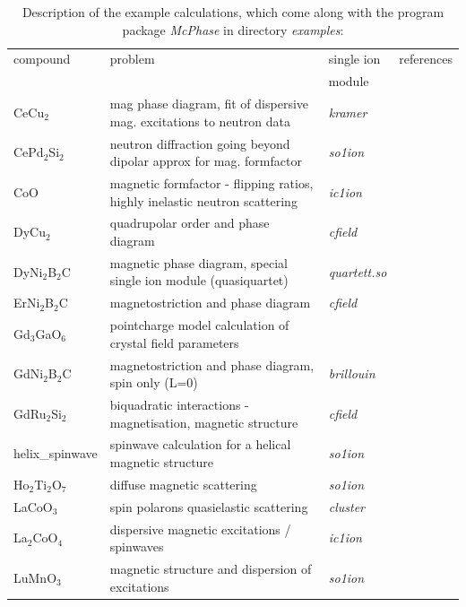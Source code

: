 \documentclass[twoside]{article}
\newcommand{\prg}{\sl}
\begin{document}
\begin{table}[thb] 
\begin{center}  
\caption {Description of the example calculations, which come along with the program package {\prg McPhase} in directory {\prg %
examples}:}   
\label{examples}   
\begin{tabular} 
{l|l|l|l}
compound & problem & single ion & references \\ 
        &          & module  &             \\
\hline
CeCu$_2$  & mag phase diagram, fit of dispersive mag. excitations to neutron data & {\prg kramer}\index{kramer} & %
\cite{loewenhaupt06-775,schedler03-1313} \\
CePd$_2$Si$_2$ & neutron diffraction going beyond dipolar approx for mag. formfactor & {\prg %
so1ion}&\cite{rotter09-140405} \\
CoO & magnetic formfactor - flipping ratios, highly inelastic neutron scattering  &{\prg  ic1ion} & \\
DyCu$_2$ & quadrupolar order and phase diagram & {\prg cfield}\index{cfield}&\cite{yoshida98-1421} \\
DyNi$_2$B$_2$C & magnetic phase diagram, special single ion module (quasiquartet) & {\prg %
quartett.so}\index{quartett.so}& \\
ErNi$_2$B$_2$C & magnetostriction and phase diagram & {\prg cfield}&\cite{doerr02-5609}\\
Gd$_3$GaO$_6$  & pointcharge model calculation of crystal field parameters & & \\ 
GdNi$_2$B$_2$C & magnetostriction and phase diagram, spin only (L=0) & {\prg brillouin}\index{brillouin}& \cite{doerr02-5609}\\
GdRu$_2$Si$_2$ & biquadratic interactions - magnetisation, magnetic structure & {\prg cfield} & \\
helix\_spinwave & spinwave calculation for a helical magnetic structure & {\prg so1ion} & \\
Ho$_2$Ti$_2$O$_7$ & diffuse magnetic scattering & {\prg so1ion} & \cite{bramwell01-1495}\\
LaCoO$_3$ & spin polarons quasielastic scattering & {\prg cluster}\index{cluster} & \cite{podlesnyak11-134430,podlesnyak08-247603} \\
La$_2$CoO$_4$ & dispersive magnetic excitations / spinwaves &{\prg  ic1ion} & \cite{lewtas10-184420}\\
LuMnO$_3$ &  magnetic structure and dispersion of excitations & {\prg so1ion} & \cite{lewtas10-184420} \\

\end{tabular}
\end{center}
\end{table}
\end{document}
